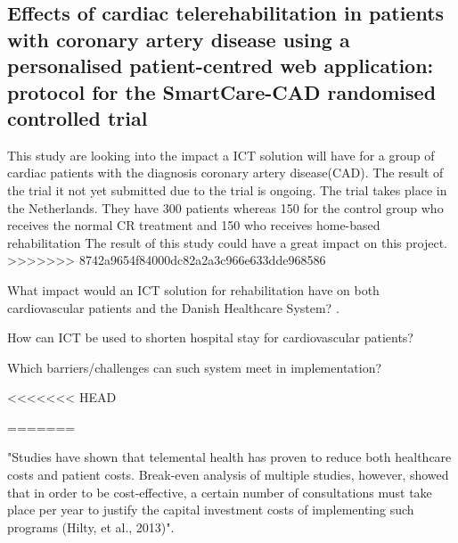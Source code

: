\subsection{Effects of cardiac telerehabilitation in patients with coronary artery disease using a personalised patient-centred web application: protocol for the SmartCare-CAD randomised controlled trial}

This study are looking into the impact a ICT solution will have for a group of cardiac patients with the diagnosis coronary artery disease(CAD). The result of the trial it not yet submitted due to the trial is ongoing. The trial takes place in the Netherlands. They have 300 patients whereas 150 for the control group who receives the normal CR treatment and 150 who receives home-based rehabilitation\cite{CAD}
The result of this study could have a great impact on this project.
>>>>>>> 8742a9654f84000dc82a2a3c966e633dde968586


What impact would an ICT solution for rehabilitation have on both cardiovascular patients and the Danish Healthcare System?
\cite{Healthconsensus}.


How can ICT be used to shorten hospital stay for cardiovascular patients?

Which barriers/challenges can such system meet in implementation?

<<<<<<< HEAD
















=======


"Studies have shown that telemental health has proven to reduce both
healthcare costs and patient costs. Break-even analysis of multiple studies, however, showed that in order
to be cost-effective, a certain number of consultations must take place per year to justify the capital
investment costs of implementing such programs (Hilty, et al., 2013)". \cite{considerations}

